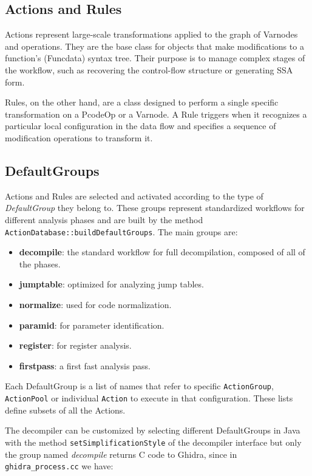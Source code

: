 \subsection{Actions and Rules}\label{sec:ActeRul}
Actions represent large-scale transformations applied to the graph of Varnodes and operations. They are the base class for objects that make modifications to a function's (Funcdata) syntax tree. Their purpose is to manage complex stages of the workflow, such as recovering the control-flow structure or generating \ac{SSA} form.

Rules, on the other hand, are a class designed to perform a single specific transformation on a PcodeOp or a Varnode. A Rule triggers when it recognizes a particular local configuration in the data flow and specifies a sequence of modification operations to transform it.

\subsection{DefaultGroups}\label{sec:dgroups}

Actions and Rules are selected and activated according to the type of \emph{DefaultGroup} they belong to.
These groups represent standardized workflows for different analysis phases and are built by the method \texttt{ActionDatabase::buildDefaultGroups}. The main groups are:

\begin{itemize}
    \item \textbf{decompile}: the standard workflow for full decompilation, composed of all of the phases.
    \item \textbf{jumptable}: optimized for analyzing jump tables.
    \item \textbf{normalize}: used for code normalization.
    \item \textbf{paramid}: for parameter identification.
    \item \textbf{register}: for register analysis.
    \item \textbf{firstpass}: a first fast analysis pass.
\end{itemize}

Each DefaultGroup is a list of names that refer to specific \texttt{ActionGroup}, \texttt{ActionPool} or individual \texttt{Action} to execute in that configuration. These lists define subsets of all the Actions.

The decompiler can be customized by selecting different DefaultGroups in Java with the method \texttt{setSimplificationStyle} of the decompiler interface but
only the group named \emph{decompile} returns C code to Ghidra, since in \texttt{ghidra\_process.cc} we have:

